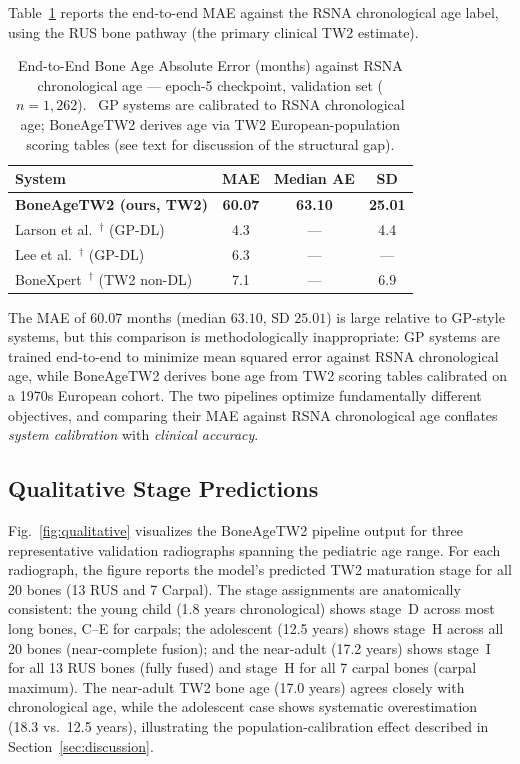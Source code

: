 \documentclass[journal]{IEEEtran}
\begin{document}
Table~\ref{tab:mae} reports the end-to-end MAE against the RSNA
chronological age label, using the RUS bone pathway
(the primary clinical TW2 estimate).

\begin{table}[!t]
  \centering
  \caption{End-to-End Bone Age Absolute Error (months) against
    RSNA chronological age — epoch-5 checkpoint,
    validation set ($n{=}1{,}262$).
    \textdagger~GP systems are calibrated to RSNA chronological age;
    BoneAgeTW2 derives age via TW2 European-population scoring tables
    (see text for discussion of the structural gap).}
  \label{tab:mae}
  \begin{tabular}{lccc}
    \toprule
    System & MAE & Median AE & SD \\
    \midrule
    \textbf{BoneAgeTW2 (ours, TW2)} & \textbf{60.07} & \textbf{63.10} & \textbf{25.01} \\
    \midrule
    Larson et al.~\cite{larson2018}$^\dagger$ (GP-DL) & 4.3 & — & 4.4 \\
    Lee et al.~\cite{lee2017}$^\dagger$ (GP-DL) & 6.3 & — & — \\
    BoneXpert~\cite{thodberg2009}$^\dagger$ (TW2 non-DL) & 7.1 & — & 6.9 \\
    \bottomrule
  \end{tabular}
\end{table}

The MAE of $60.07$ months (median $63.10$, SD $25.01$) is large
relative to GP-style systems, but this comparison is methodologically
inappropriate: GP systems are trained end-to-end to minimize
mean squared error against RSNA chronological age, while BoneAgeTW2
derives bone age from TW2 scoring tables calibrated on a 1970s
European cohort.
The two pipelines optimize fundamentally different objectives, and
comparing their MAE against RSNA chronological age conflates
\textit{system calibration} with \textit{clinical accuracy}.

\subsection{Qualitative Stage Predictions}

Fig.~\ref{fig:qualitative} visualizes the BoneAgeTW2 pipeline output
for three representative validation radiographs spanning the pediatric
age range.
For each radiograph, the figure reports the model's predicted TW2
maturation stage for all 20 bones (13 RUS and 7 Carpal).
The stage assignments are anatomically consistent:
the young child (1.8 years chronological) shows stage~D across
most long bones, C--E for carpals;
the adolescent (12.5 years) shows stage~H across all 20 bones
(near-complete fusion);
and the near-adult (17.2 years) shows stage~I for all 13 RUS bones
(fully fused) and stage~H for all 7 carpal bones (carpal maximum).
The near-adult TW2 bone age (17.0 years) agrees closely with
chronological age, while the adolescent case shows systematic
overestimation (18.3 vs.\ 12.5 years), illustrating the
population-calibration effect described in Section~\ref{sec:discussion}.
\end{document}
